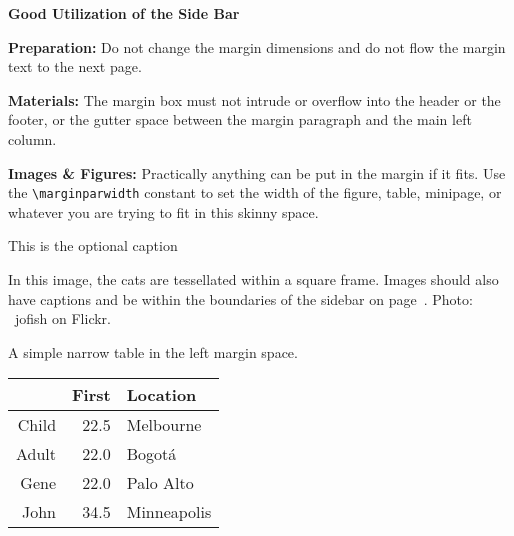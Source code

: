 \documentclass[sigchi-a, authorversion]{acmart}
\begin{document}
\begin{sidebar}
  \textbf{Good Utilization of the Side Bar}

  \textbf{Preparation:} Do not change the margin
  dimensions and do not flow the margin text to the
  next page.

  \textbf{Materials:} The margin box must not intrude
  or overflow into the header or the footer, or the gutter space
  between the margin paragraph and the main left column.

  \textbf{Images \& Figures:} Practically anything
  can be put in the margin if it fits. Use the
  \texttt{{\textbackslash}marginparwidth} constant to set the
  width of the figure, table, minipage, or whatever you are trying
  to fit in this skinny space.

  \caption{This is the optional caption}
  \label{bar:sidebar}
\end{sidebar}



\begin{marginfigure}
    \caption{In this image, the cats are tessellated within a square
      frame. Images should also have captions and be within the
      boundaries of the sidebar on page~\pageref{bar:sidebar}. Photo:
      \cczero~jofish on Flickr.}
    \label{fig:marginfig}
\end{marginfigure}

\begin{margintable}
    \caption{A simple narrow table in the left margin
      space.}
    \label{tab:table2}
    \begin{tabular}{r r l}
      & {\small \textbf{First}}
      & {\small \textbf{Location}} \\
      \toprule
      Child & 22.5 & Melbourne \\
      Adult & 22.0 & Bogot\'a \\
      \midrule
      Gene & 22.0 & Palo Alto \\
      John & 34.5 & Minneapolis \\
      \bottomrule
    \end{tabular}
\end{margintable}



\end{document}
